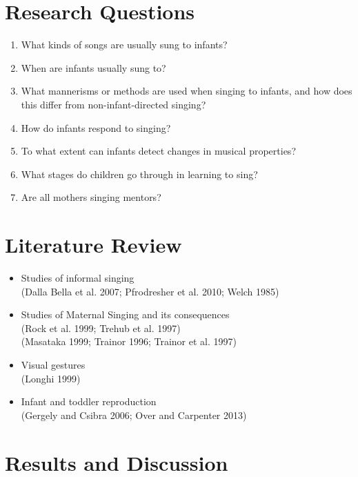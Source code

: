 \documentclass{beamer}
\begin{document}
\section{Research Questions}
\begin{frame}
	\begin{enumerate}
		\item What kinds of songs are usually sung to infants?
			\pause
		\item When are infants usually sung to?
			\pause
		\item What mannerisms or methods are used when singing to infants, and how does this differ from non-infant-directed singing?
			\pause
		\item How do infants respond to singing?
			\pause
		\item To what extent can infants detect changes in musical properties?
			\pause
		\item What stages do children go through in learning to sing?
			\pause
		\item Are all mothers singing mentors?
	\end{enumerate}
\end{frame}

\section{Literature Review}
\begin{frame}
	\begin{itemize}
		\item Studies of informal singing \\ 
			(Dalla Bella et al. 2007; Pfrodresher et al. 2010; Welch 1985) 
			\pause
		\item Studies of Maternal Singing and its consequences \\ 
			(Rock et al. 1999; Trehub et al. 1997) \\ 
			(Masataka 1999; Trainor 1996; Trainor et al. 1997) 
			\pause
		\item Visual gestures \\ 
			(Longhi 1999) 
			\pause
		\item Infant and toddler reproduction \\ 
			(Gergely and Csibra 2006; Over and Carpenter 2013) 
	\end{itemize}
\end{frame}


\section{Results and Discussion}
\end{document}
